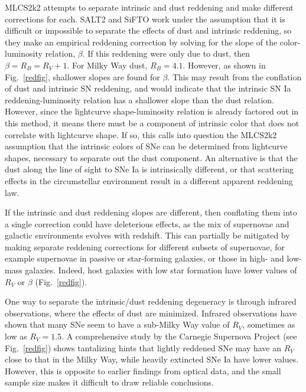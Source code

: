 \documentclass{nature1}
\begin{document}
MLCS2k2 attempts to separate intrinsic and dust reddening and make
different corrections for each\citep{2007ApJ...659..122J}.  
SALT2 and SiFTO work under the assumption that it is difficult or
impossible to separate the effects of dust and intrinsic reddening, so
they make an empirical reddening correction by solving for the slope
of the color-luminosity relation, $\beta $.  If this reddening were
only due to dust, then $\beta=R_B=R_V+1.$ For Milky Way dust,
$R_B=4.1$\citep{1989ApJ...345..245C}.  However, as shown in
Fig.~\ref{redfig}, shallower slopes are found for
$\beta$.  This may result from the
conflation of dust and intrinsic SN reddening, and would indicate that
the intrinsic SN Ia reddening-luminosity relation has a shallower
slope than the dust relation.  However, since the lightcurve
shape-luminosity relation is already factored out in this
method\citep{2006A&A...447...31A}, it means there must be a component
of intrinsic color that does not correlate with lightcurve
shape\citep{2007ApJ...664L..13C}.  If so, this calls into question the
MLCS2k2 assumption that the intrinsic colors of SNe can be determined
from lightcurve shapes, necessary to separate out the dust component.
An alternative is that the dust along the line of sight to SNe Ia is
intrinsically different, or that scattering effects in the
circumstellar environment result in a different apparent reddening
law\citep{2005ApJ...635L..33W, 2008ApJ...686L.103G}.

If the intrinsic and dust reddening slopes are different, then
conflating them into a single correction could have deleterious
effects, as the mix of supernovae and galactic environments evolves
with redshift\citep{2007ApJ...667L..37H}.  This can partially be
mitigated by making separate reddening corrections for different
subsets of supernovae, for example supernovae in passive or
star-forming galaxies, or those in high- and low-mass galaxies.
Indeed, host galaxies with low star formation have lower values of
$R_V$ or $\beta $\citep{2010MNRAS.406..782S,2010ApJ...722..566L}
(Fig.~\ref{redfig}).

One way to separate the intrinsic/dust reddening degeneracy is through
infrared observations, where the effects of dust are minimized.
Infrared observations have shown that many SNe seem to have a
sub-Milky Way value of $R_V$, sometimes as low as
$R_V=1.5$\citep{2008MNRAS.384..107E,2007AJ....133...58K}.  A
comprehensive study by the Carnegie Supernova Project (see
Fig.~\ref{redfig}) shows tantalizing hints that lightly reddened SNe
may have an $R_V$ close to that in the Milky Way, while heavily
extincted SNe Ia have lower values\citep{2010AJ....139..120F}.
However, this is opposite to earlier findings from 
optical data\citep{2008A&A...487...19N}, and the small sample size makes it
difficult to draw reliable conclusions.
\end{document}
